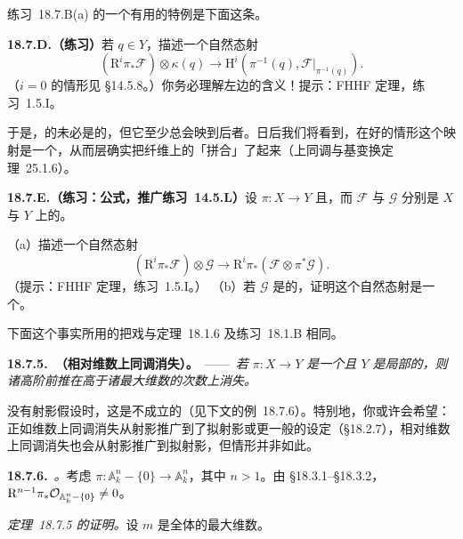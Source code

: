 \mbox{练习~18.7.B(a)} 的一个有用的特例是下面这条。

\textbf{18.7.D.（练习）}\quad 若 $q\in Y$，描述一个自然态射
\[
(\mathrm{R}^i\pi_*\mathscr{F})\otimes\kappa(q)\longrightarrow\mathrm{H}^i(\pi^{-1}(q),\mathscr{F}|_{\pi^{-1}(q)}).
\]
（$i=0$ 的情形见 \S14.5.8。）你务必理解左边的含义！提示：FHHF 定理，\mbox{练习~1.5.I}。

于是，\trPushforward{}的\trFiber{}未必是\trFiber{}的\trCohomology，但它至少总会映到后者。日后我们将看到，在好的情形这个映射是一个\trIsomorphism，从而\trHigherPushforward{}层确实把纤维上的\trCohomology{}「拼合」了起来（\mbox{上同调与基变换定理~25.1.6}）。

\textbf{18.7.E.（练习：\trProjection{}公式，推广\mbox{练习~14.5.L}）}\quad 设 $\pi\colon X\to Y$ \trQuasicompact{}且\trSeparated，而 $\mathscr{F}$ 与 $\mathscr{G}$ 分别是 $X$ 与 $Y$ 上的\trQCSheaf。
（a）描述一个自然态射
\[
(\mathrm{R}^i\pi_*\mathscr{F})\otimes\mathscr{G}\longrightarrow\mathrm{R}^i\pi_*(\mathscr{F}\otimes\pi^*\mathscr{G}).
\]
（提示：FHHF 定理，\mbox{练习~1.5.I}。）
（b）若 $\mathscr{G}$ 是\trLocallyFree{}的，证明这个自然态射是一个\trIsomorphism。

下面这个事实所用的把戏与\mbox{定理~18.1.6} 及\mbox{练习~18.1.B} 相同。

\textbf{18.7.5.\ \trhTheorem（相对维数上同调消失）。}\ ——\ \emph{若 $\pi\colon X\to Y$ 是一个\trProjective\trMorphism{}且 $Y$ 是局部\trNoetherian{}的，则诸高阶前推在高于诸\trFiber{}最大维数的次数上消失。}

没有射影假设时，这是不成立的（见下文的\mbox{例~18.7.6}）。特别地，你或许会希望：正如维数上同调消失从射影\trVariety{}推广到了拟射影\trVariety{}或更一般的设定（\S18.2.7），相对维数上同调消失也会从射影\trMorphism{}推广到拟射影\trMorphism，但情形并非如此。

\textbf{18.7.6.}\ \emph{\trhExample{}。}\quad 考虑\trOpenEmbedding{} $\pi\colon\mathbb{A}^n_k-\{0\}\to\mathbb{A}^n_k$，其中 $n>1$。由 \S18.3.1--\S18.3.2，$\mathrm{R}^{n-1}\pi_*\mathcal{O}_{\mathbb{A}^n_k-\{0\}}\neq 0$。

\emph{\mbox{定理~18.7.5} 的证明。}\quad 设 $m$ 是全体\trFiber{}的最大维数。

